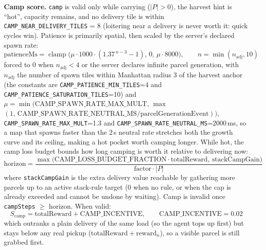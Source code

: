 \documentclass[11pt,a4paper]{article}
\renewcommand{\paragraph}[1]{\par\smallskip\noindent\textbf{#1}}
\begin{document}
\paragraph{Camp score.} \texttt{camp} is valid only while carrying ($|P|>0$), the harvest hint
is ``hot'', capacity remains, and no delivery tile is within
\texttt{CAMP\_NEAR\_DELIVERY\_TILES} = 8 (loitering near a delivery is never worth it: quick
cycles win). Patience is primarily spatial, then scaled by the server's declared spawn rate:
\begin{equation}
\text{patienceMs} = \operatorname{clamp}\!\big(\mu\cdot 1000\cdot(1.37^{\,n-3}-1),\,0,\,\mu\cdot 8000\big),
\qquad n=\min(n_{\text{adj}},10)
\label{eq:camp-patience}
\end{equation}
forced to 0 when $n_{\text{adj}} < 4$ or the server declares infinite parcel generation, with
$n_{\text{adj}}$ the number of spawn tiles within Manhattan radius 3 of the harvest anchor (the
constants are \texttt{CAMP\_PATIENCE\_MIN\_TILES}=4 and \texttt{CAMP\_PATIENCE\_SATURATION\_TILES}=10)
and $\mu=\min\!\big(\text{CAMP\_SPAWN\_RATE\_MAX\_MULT},\,\max$\\$(1,\,\text{CAMP\_SPAWN\_RATE\_NEUTRAL\_MS}/\text{parcelGenerationEvent})\big)$,
\texttt{CAMP\_SPAWN\_RATE\_MAX\_MULT}=1.3 and \texttt{CAMP\_SPAWN\_RATE\_NEUTRAL\_MS}=2000\,ms, so a
map that spawns faster than the 2\,s neutral rate stretches both the growth curve and its ceiling,
making a hot pocket worth camping longer. While hot, the camp loss
budget bounds how long camping is worth it relative to delivering now:
\begin{equation}
\text{horizon} = \frac{\max\big(\text{CAMP\_LOSS\_BUDGET\_FRACTION}\cdot\text{totalReward},\ \text{stackCampGain}\big)}{\text{factor}\cdot|P|}
\label{eq:camp-horizon}
\end{equation}
where \texttt{stackCampGain} is the extra delivery value reachable by gathering more parcels up
to an active stack-rule target (0 when no rule, or when the cap is already exceeded and cannot
be undone by waiting). Camp is invalid once \texttt{campSteps} $\geq$ horizon. When valid:
\begin{equation}
S_{\text{camp}} = \text{totalReward} + \text{CAMP\_INCENTIVE},\qquad \text{CAMP\_INCENTIVE}=0.02
\label{eq:camp-score}
\end{equation}
which outranks a plain delivery of the same load (so the agent tops up first) but stays below
any real pickup (\(\text{totalReward}+\text{reward}_n\)), so a visible parcel is still grabbed
first.
\end{document}
